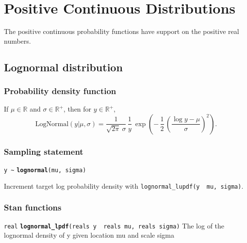 \documentclass[
  10pt,
]{book}
\begin{document}
\hypertarget{positive-continuous-distributions}{%
\chapter{Positive Continuous Distributions}\label{positive-continuous-distributions}}

The positive continuous probability functions have support on the
positive real numbers.

\hypertarget{lognormal}{%
\section{Lognormal distribution}\label{lognormal}}

\hypertarget{probability-density-function-8}{%
\subsection{Probability density function}\label{probability-density-function-8}}

If \(\mu \in \mathbb{R}\) and \(\sigma \in \mathbb{R}^+\), then for \(y \in \mathbb{R}^+\), \[ \text{LogNormal}(y|\mu,\sigma) = \frac{1}{\sqrt{2
\pi} \ \sigma} \, \frac{1}{y} \ \exp \! \left(        - \, \frac{1}{2}
\, \left( \frac{\log y - \mu}{\sigma} \right)^2      \right) . \]

\hypertarget{sampling-statement-32}{%
\subsection{Sampling statement}\label{sampling-statement-32}}

\texttt{y\ \textasciitilde{}} \textbf{\texttt{lognormal}}\texttt{(mu,\ sigma)}

Increment target log probability density with \texttt{lognormal\_lupdf(y\ \textbar{}\ mu,\ sigma)}.

\hypertarget{stan-functions-31}{%
\subsection{Stan functions}\label{stan-functions-31}}


\texttt{real} \textbf{\texttt{lognormal\_lpdf}}\texttt{(reals\ y\ \textbar{}\ reals\ mu,\ reals\ sigma)}\newline
The log of the lognormal density of y given location mu and scale
sigma
\end{document}
